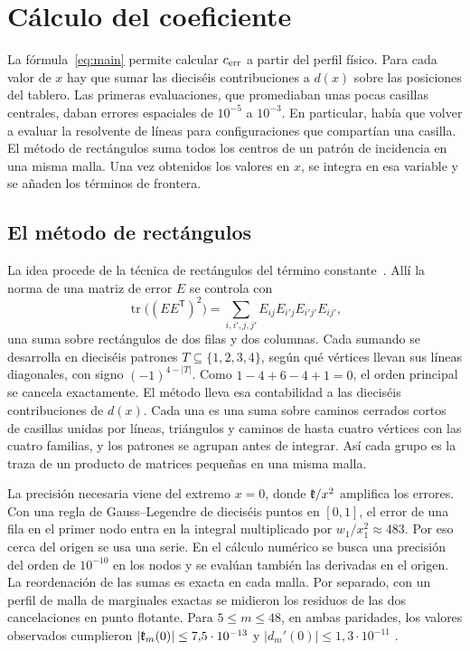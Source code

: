 \section{Cálculo del coeficiente}\label{sec:numeval}
La fórmula~\eqref{eq:main} permite calcular $c_{\mathrm{err}}$ a partir del perfil físico. Para cada valor de $x$
hay que sumar las dieciséis contribuciones a $d(x)$ sobre las posiciones del tablero. Las primeras
evaluaciones, que promediaban unas pocas casillas centrales, daban errores espaciales de $10^{-5}$
a $10^{-3}$. En particular, había que volver a evaluar la resolvente de líneas para configuraciones
que compartían una casilla. El método de rectángulos suma todos los
centros de un patrón de incidencia en una misma malla. Una vez obtenidos los valores en $x$, se
integra en esa variable y se añaden los términos de frontera.

\subsection{El método de rectángulos}\label{sec:rectangulos}
La idea procede de la técnica de rectángulos del término constante~\cite[\S4]{tc}. Allí la norma de
una matriz de error $E$ se controla con
\[
 \operatorname{tr}\bigl((EE^{\mathsf T})^2\bigr)=\sum_{i,i',j,j'}E_{ij}E_{i'j}E_{i'j'}E_{ij'},
\]
una suma sobre rectángulos de dos filas y dos columnas. Cada sumando se desarrolla en dieciséis
patrones $T\subseteq\{1,2,3,4\}$, según qué vértices llevan sus líneas diagonales, con signo
$(-1)^{4-|T|}$. Como $1-4+6-4+1=0$, el orden principal se cancela exactamente. El método lleva esa
contabilidad a las dieciséis contribuciones de $d(x)$. Cada una es una suma sobre caminos cerrados
cortos de casillas unidas por líneas, triángulos y caminos de hasta cuatro vértices con las cuatro
familias, y los patrones se agrupan antes de integrar. Así cada grupo es la traza de un producto de
matrices pequeñas en una misma malla.

La precisión necesaria viene del extremo $x=0$, donde $\mathfrak{k}/x^2$ amplifica los errores. Con una regla de
Gauss--Legendre de dieciséis puntos en $[0,1]$, el error de una fila en el primer nodo entra en la
integral multiplicado por $w_1/x_1^2\approx483$. Por eso cerca del origen se usa una serie. En el
cálculo numérico se busca una precisión del orden de $10^{-10}$ en los nodos y se evalúan también
las derivadas en el origen. La reordenación de las sumas es exacta en cada malla. Por separado,
con un perfil de malla de marginales exactas se midieron los residuos de las dos cancelaciones en
punto flotante. Para $5\le m\le48$, en ambas paridades, los valores observados cumplieron
$|\mathfrak{k}_m(0)|\le7{,}5\cdot10^{-13}$ y $|d_m'(0)|\le1{,}3\cdot10^{-11}$ .

